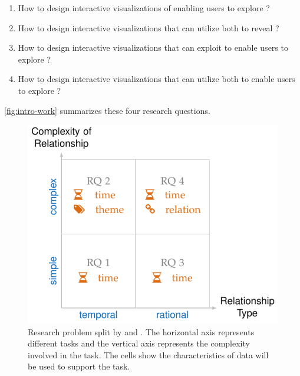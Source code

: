 \begin{enumerate}
	\item How to design interactive visualizations of  enabling users to explore ?
	
	\item How to design interactive visualizations that can utilize both  to reveal ?	
	
	\item How to design interactive visualizations that can exploit  to enable users to explore ?
	
	\item How to design interactive visualizations that can utilize both  to enable users to explore ?				
\end{enumerate}

\autoref{fig:intro-work} summarizes these four research questions.

\begin{figure}[!htb]
	\centering
	\includegraphics{work}
	\caption{Research problem split by  and . The horizontal axis represents different tasks and the vertical axis represents the complexity involved in the  task. The cells show the characteristics of data will be used to support the task.}
	\label{fig:intro-work}
\end{figure}

